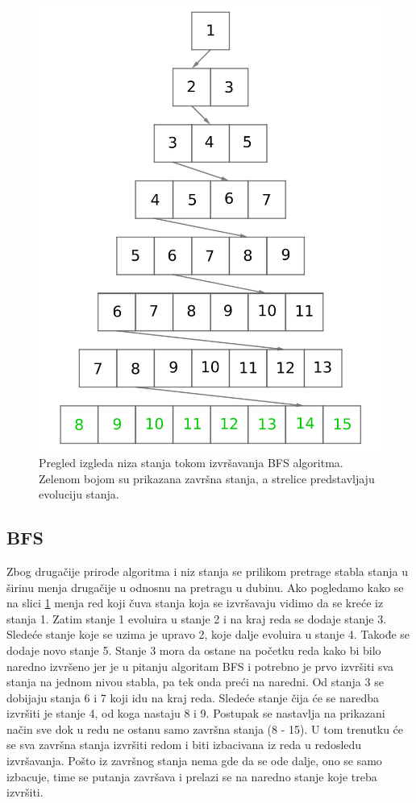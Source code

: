 \documentclass[12pt,oneside]{memoir}
\begin{document}
\begin{figure}[ht]
    \centering
    \includegraphics[width=0.6\linewidth]{BFS_stanja_1.png}
    \caption{Pregled izgleda niza stanja tokom izvršavanja BFS algoritma. Zelenom bojom su prikazana završna stanja, a strelice predstavljaju evoluciju stanja.}
    \label{fig:BFS_stanja}
\end{figure}
\bigbreak

\subsection{BFS} 
Zbog drugačije prirode algoritma i niz stanja se prilikom pretrage stabla stanja u širinu menja drugačije u odnosnu na pretragu u dubinu. Ako pogledamo kako se na slici \ref{fig:BFS_stanja} menja red koji čuva stanja koja se izvršavaju vidimo da se kreće iz stanja 1. Zatim stanje 1 evoluira u stanje 2 i na kraj reda se dodaje stanje 3. Sledeće stanje koje se uzima je upravo 2, koje dalje evoluira u stanje 4. Takođe se dodaje novo stanje 5. Stanje 3 mora da ostane na početku reda kako bi bilo naredno izvršeno jer je u pitanju algoritam BFS i potrebno je prvo izvršiti sva stanja na jednom nivou stabla, pa tek onda preći na naredni. Od stanja 3 se dobijaju stanja 6 i 7 koji idu na kraj reda. Sledeće stanje čija će se naredba izvršiti je stanje 4, od koga nastaju 8 i 9. Postupak se nastavlja na prikazani način sve dok u redu ne ostanu samo završna stanja (8 - 15). U tom trenutku će se sva završna stanja izvršiti redom i biti izbacivana iz reda u redosledu izvršavanja. Pošto iz završnog stanja nema gde da se ode dalje, ono se samo izbacuje, time se putanja završava i prelazi se na naredno stanje  koje treba izvršiti.
\end{document}
